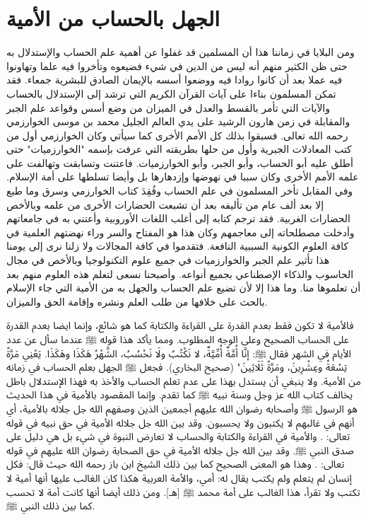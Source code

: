 \section{الجهل بالحساب من الأمية}

ومن البلايا في زماننا هذا أن المسلمين قد غفلوا عن أهمية علم الحساب والإستدلال به حتى ظن الكثير منهم أنه ليس من الدين في شيء فضيعوه وتأخروا فيه علما وتهاونوا فيه عملا بعد أن كانوا روادا فيه ووضعوا أسسه بالإيمان الصادق للبشرية جمعاء. فقد تمكن المسلمون  بناءا على آيات القرآن الكريم التي ترشد إلى الإستدلال بالحساب والآيات التي تأمر بالقسط والعدل في الميزان من وضع أسس وقواعد علم الجبر والمقابلة في زمن هارون الرشيد على يدي العالم الجليل محمد بن موسى الخوارزمي رحمه الله تعالى. فسبقوا بذلك كل الأمم الأخرى كما سيأتي وكان الخوارزمي أول من كتب المعادلات الجبرية وأول من حلها بطريقته التي عرفت بإسمه "الخوارزميات" حتى أطلق عليه أبو الحساب، وأبو الجبر، وأبو الخوارزميات. فاعتنت وتسابقت وتهالفت على علمه الأمم الأخرى وكان سببا في نهوضها وإزدهارها بل وأيضا تسلطها على أمة الإسلام. وفي المقابل تأخر المسلمون في علم الحساب وفُقِدَ كتاب الخوارزمي وسرق وما طبع إلا بعد ألف عام من تأليفه بعد أن تشبعت الحضارات الأخرى من علمه وبالأخص الحضارات الغربية. فقد ترجم كتابه إلى أغلب اللغات الأوروبية وأعتني به في جامعاتهم وأدخلت مصطلحاته إلى معاجمهم وكان هذا هو المفتاح والسر وراء نهضتهم العلمية في كافة العلوم الكونية السببية النافعة. فتقدموا في كافة المجالات ولا زلنا نرى إلى يومنا هذا تأثير علم الجبر والخوارزميات في جميع علوم التكنولوجيا وبالأخص في مجال الحاسوب والذكاء الإصطناعي بجميع أنواعه. وأصبحنا نسعى لتعلم هذه العلوم منهم بعد أن تعلموها منا. وما هذا إلا لأن تضيع علم الحساب والجهل به من الأمية التي جاء الإسلام بالحث على خلافها من طلب العلم ونشره وإقامة الحق والميزان. 

فالأمية لا تكون فقط بعدم القدرة على القراءة والكتابة كما هو شائع، وإنما ايضا بعدم القدرة على الحساب الصحيح وعلى الوجه المطلوب. ومما يأكد هذا قوله ﷺ عندما سأل عن عدد الأيام في الشهر فقال ﷺ: إنَّا أُمَّةٌ أُمِّيَّةٌ، لا نَكْتُبُ ولَا نَحْسُبُ، الشَّهْرُ هَكَذَا وهَكَذَا. يَعْنِي مَرَّةً تِسْعَةً وعِشْرِينَ، ومَرَّةً ثَلَاثِينَ" {\footnotesize (صحيح البخاري)}. فجعل ﷺ الجهل بعلم الحساب في زمانه من الأمية. ولا ينبغي أن يستدل بهذا على عدم تعلم الحساب والأخذ به فهذا الإستدلال باطل يخالف كتاب الله عز وجل وسنة نبيه ﷺ كما تقدم. وإنما المقصود بالأمية في هذا الحديث هو الرسول ﷺ وأصحابه رضوان الله عليهم أجمعين الذين وصفهم الله جل جلاله بالأمية، أي أنهم في غالبهم لا يكتبون ولا يحسبون. وقد بين الله جل جلاله الأمية في حق نبيه في قوله تعالى: \quranayah*[7][158][21]{\footnotesize \surahname*[7]}. والأمية في القراءة والكتابة والحساب لا تعارض النبوة في شيء بل هي دليل على صدق النبي ﷺ. وقد بين الله جل جلاله الأمية في حق الصحابة رضوان الله عليهم في قوله تعالى: \quranayah*[62][2]{\footnotesize \surahname*[62]}. وهذا هو المعنى الصحيح كما بين ذلك الشيخ ابن باز رحمه الله حيث قال: فكل إنسان لم يتعلم ولم يكتب يقال له: أمي، والأمة العربية هكذا كان الغالب عليها أنها أمية لا تكتب ولا تقرأ، هذا الغالب على أمة محمد ﷺ [هـ]. ومن ذلك أيضا أنها كانت أمة لا تحسب كما بين ذلك النبي ﷺ.

